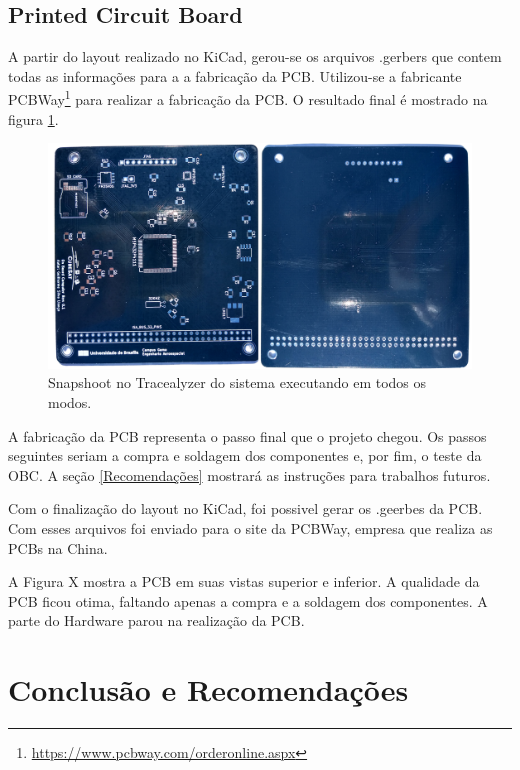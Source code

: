 \section{Printed Circuit Board}

A partir do layout realizado no KiCad, gerou-se os arquivos .gerbers que contem todas as informações para a a fabricação da PCB. Utilizou-se a fabricante PCBWay\footnote{\url{https://www.pcbway.com/orderonline.aspx}} para realizar a fabricação da PCB. O resultado final é mostrado na figura \ref{pcb_bothSides}.


\begin{figure}[h]
	\centering
	\caption{Snapshoot no Tracealyzer do sistema executando em todos os modos.}
	\includegraphics[keepaspectratio=true,scale=0.7]{figuras/pcb_bothSides.png}
	
	\label{pcb_bothSides}
\end{figure}

A fabricação da PCB representa o passo final que o projeto chegou. Os passos seguintes seriam a compra e soldagem dos componentes e, por fim, o teste da OBC. A seção \ref{Recomendações} mostrará as instruções para trabalhos futuros.


Com o finalização do layout no KiCad, foi possivel gerar os .geerbes da PCB. Com esses arquivos foi enviado para o site da PCBWay, empresa que realiza as PCBs na China. 

A Figura X mostra a PCB em suas vistas superior e inferior. A qualidade da PCB ficou otima, faltando apenas a compra e a soldagem dos componentes. A parte do Hardware parou na realização da PCB.


\chapter[Conclusão e Recomendações]{Conclusão e Recomendações}

